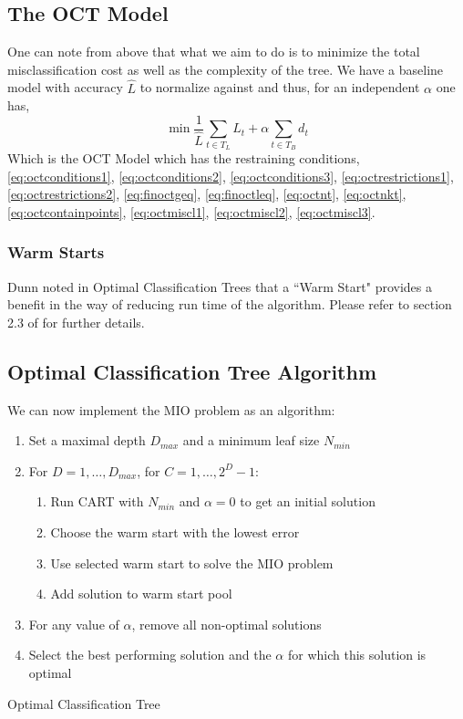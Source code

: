 \documentclass[11pt,a4paper]{report}
\begin{document}
\subsection{The OCT Model}
One can note from above that what we aim to do is to minimize the total misclassification cost as well as the complexity of the tree. 
We have a baseline model with accuracy $\hat{L}$ to normalize against and thus, for an independent $\alpha$ one has,
\begin{equation}
    \min \frac{1}{\hat{L}} \sum_{t \in T_L} L_t + \alpha \sum_{t \in T_B} d_t
    \label{eq:OCTmodel}
\end{equation}
Which is the OCT Model which has the restraining conditions, \ref{eq:octconditions1}, \ref{eq:octconditions2}, \ref{eq:octconditions3}, \ref{eq:octrestrictions1}, \ref{eq:octrestrictions2}, \ref{eq:finoctgeq}, \ref{eq:finoctleq}, \ref{eq:octnt}, \ref{eq:octnkt}, \ref{eq:octcontainpoints}, \ref{eq:octmiscl1}, \ref{eq:octmiscl2}, \ref{eq:octmiscl3}.

\subsubsection{Warm Starts}
Dunn noted in Optimal Classification Trees \cite{oct} that a ``Warm Start" provides a benefit in the way of reducing run time of the algorithm. Please refer to section 2.3 of \cite{oct} for further details.

\subsection{Optimal Classification Tree Algorithm}
We can now implement the MIO problem as an algorithm:
\begin{algorithm}
\SetAlgoLined
\begin{enumerate}
    \item Set a maximal depth $D_{max}$ and a minimum leaf size $N_{min}$
    
    \item For $D = 1,\dots,D_{max}$, for $C = 1,\dots,2^D - 1$:
    \begin{enumerate}
        \item Run CART with $N_{min}$ and $\alpha = 0$ to get an initial solution
        
        \item Choose the warm start with the lowest error
        
        \item Use selected warm start to solve the MIO problem
        
        \item Add solution to warm start pool
    \end{enumerate}
    \item For any value of $\alpha$, remove all non-optimal solutions
    
    \item Select the best performing solution and the $\alpha$ for which this solution is optimal
\end{enumerate}
\caption{Optimal Classification Tree}
\end{algorithm}
\end{document}
